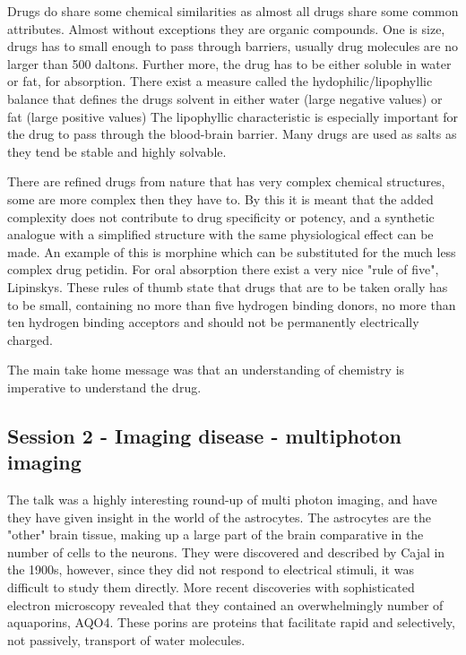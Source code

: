 \documentclass[12p]{article}
\begin{document}
Drugs do share some chemical similarities as almost all drugs share some common attributes.
Almost without exceptions they are organic compounds.
One is size, drugs has to small enough to pass through barriers, usually drug molecules are no larger than 500 daltons.
Further more, the drug has to be either soluble in water or fat, for absorption.
There exist a measure called the hydophilic/lipophyllic balance that defines the drugs solvent in either water (large negative values) or fat (large positive values)
The lipophyllic characteristic is especially important for the drug to pass through the blood-brain barrier.
Many drugs are used as salts as they tend be stable and highly solvable.

There are refined drugs from nature that has very complex chemical structures, some are more complex then they have to.
By this it is meant that the added complexity does not contribute to drug specificity or potency, and a synthetic analogue with a simplified structure with the same physiological effect can be made.
An example of this is morphine which can be substituted for the much less complex drug petidin.
For oral absorption there exist a very nice "rule of five", Lipinskys.
These rules of thumb state that drugs that are to be taken orally has to be small, containing no more than five hydrogen binding donors, no more than ten hydrogen binding acceptors and should not be permanently electrically charged.

The main take home message was that an understanding of chemistry is imperative to understand the drug.


\subsection*{Session 2 - Imaging disease - multiphoton imaging}

The talk was a highly interesting round-up of multi photon imaging, and have they have given insight in the world of the astrocytes.
The astrocytes are the "other" brain tissue, making up a large part of the brain comparative in the number of cells to the neurons.
They were discovered and described by Cajal in the 1900s, however, since they did not respond to electrical stimuli, it was difficult to study them directly.
More recent discoveries with sophisticated electron microscopy revealed that they contained an overwhelmingly number of aquaporins, AQO4.
These porins are proteins that facilitate rapid and selectively, not passively, transport of water molecules.
\end{document}
